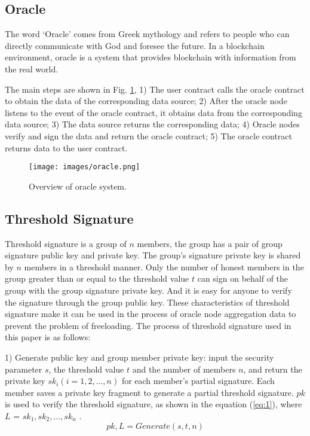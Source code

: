 \documentclass[paper]{ieice}
\begin{document}
\subsection{Oracle}
 The word `Oracle' comes from Greek mythology and refers to people who can directly communicate with God and foresee the future. In a blockchain environment, oracle is a system that provides blockchain with information from the real world\cite{caldarelli2020understanding}.
 
 The main steps are shown in Fig. \ref{fig:Oracle}, 1) The user contract calls the oracle contract to obtain the data of the corresponding data source; 2) After the oracle node listens to the event of the oracle contract, it obtains data from the corresponding data source; 3) The data source returns the corresponding data; 4) Oracle nodes verify and sign the data and return the oracle contract; 5) The oracle contract returns data to the user contract.
 \begin{figure}[h!]
        \centering
        \texttt{[image: images/oracle.png]}
        \caption{Overview of oracle system.}
        \label{fig:Oracle}
\end{figure}

 \subsection{Threshold Signature}
 Threshold signature is a group of $n$ members, the group has a pair of group signature public key and private key\cite{rong2015key}. The group's signature private key is shared by $n$ members in a threshold manner. Only the number of honest members in the group greater than or equal to the threshold value $t$ can sign on behalf of the group with the group signature private key. And it is easy for anyone to verify the signature through the group public key. These characteristics of threshold signature make it can be used in the process of oracle node aggregation data to prevent the problem of freeloading\cite{chainlink}. The process of threshold signature used in this paper is as follows:

 1) Generate public key and group member private key: input the security parameter $s$, the threshold value $t$ and the number of members $n$, and return the private key $sk_i (i=1,2,...,n)$ for each member's partial signature. Each member saves a private key fragment to generate a partial threshold signature. $pk$ is used to verify the threshold signature, as shown in the equation (\ref{eq:1}), where $L$ = { $sk_1,sk_2,...,sk_n$ }.
 \begin{equation}
    \label{eq:1}
        pk,L = Generate(s,t,n)
\end{equation}
\end{document}
